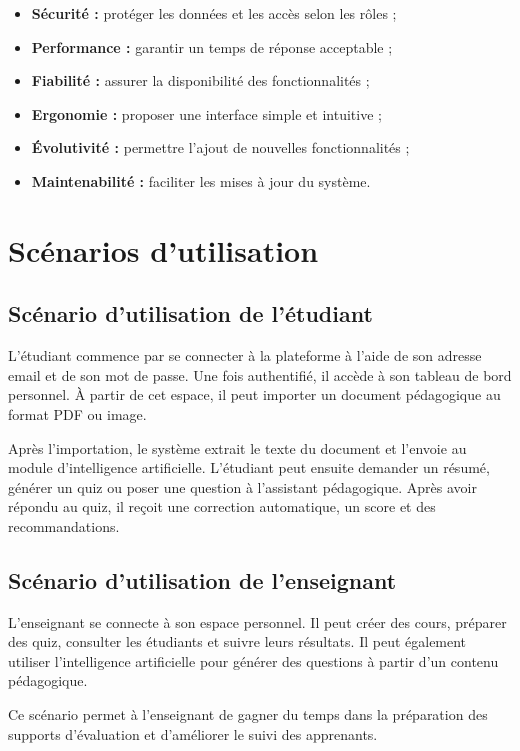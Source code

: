 \documentclass[12pt,a4paper]{report}
\begin{document}
\begin{itemize}
    \item \textbf{Sécurité :} protéger les données et les accès selon les rôles ;
    \item \textbf{Performance :} garantir un temps de réponse acceptable ;
    \item \textbf{Fiabilité :} assurer la disponibilité des fonctionnalités ;
    \item \textbf{Ergonomie :} proposer une interface simple et intuitive ;
    \item \textbf{Évolutivité :} permettre l'ajout de nouvelles fonctionnalités ;
    \item \textbf{Maintenabilité :} faciliter les mises à jour du système.
\end{itemize}

\section{Scénarios d'utilisation}

\subsection{Scénario d'utilisation de l'étudiant}

L'étudiant commence par se connecter à la plateforme à l'aide de son adresse
email et de son mot de passe. Une fois authentifié, il accède à son tableau de
bord personnel. À partir de cet espace, il peut importer un document pédagogique
au format PDF ou image.

Après l'importation, le système extrait le texte du document et l'envoie au
module d'intelligence artificielle. L'étudiant peut ensuite demander un résumé,
générer un quiz ou poser une question à l'assistant pédagogique. Après avoir
répondu au quiz, il reçoit une correction automatique, un score et des
recommandations.

\subsection{Scénario d'utilisation de l'enseignant}

L'enseignant se connecte à son espace personnel. Il peut créer des cours,
préparer des quiz, consulter les étudiants et suivre leurs résultats. Il peut
également utiliser l'intelligence artificielle pour générer des questions à
partir d'un contenu pédagogique.

Ce scénario permet à l'enseignant de gagner du temps dans la préparation des
supports d'évaluation et d'améliorer le suivi des apprenants.
\end{document}

